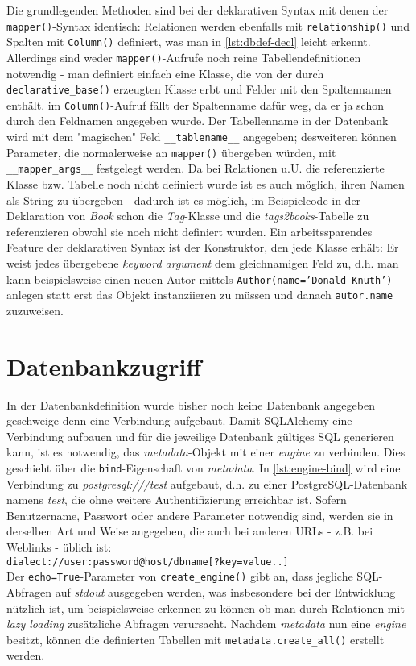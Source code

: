 Die grundlegenden Methoden sind bei der deklarativen Syntax mit denen der
\texttt{mapper()}-Syntax identisch: Relationen werden ebenfalls mit
\texttt{relationship()} und Spalten mit \texttt{Column()} definiert, was man in
\autoref{lst:dbdef-decl} leicht erkennt.
Allerdings sind weder \texttt{mapper()}-Aufrufe noch reine Tabellendefinitionen
notwendig - man definiert einfach eine Klasse, die von der durch
\texttt{declarative\_base()} erzeugten Klasse erbt und Felder mit den
Spaltennamen enthält. im \texttt{Column()}-Aufruf fällt der Spaltenname dafür
weg, da er ja schon durch den Feldnamen angegeben wurde. Der Tabellenname in der
Datenbank wird mit dem "magischen" Feld \texttt{\_\_tablename\_\_} angegeben;
desweiteren können Parameter, die normalerweise an \texttt{mapper()} übergeben
würden, mit \texttt{\_\_mapper\_args\_\_} festgelegt werden.
Da bei Relationen u.U. die referenzierte Klasse bzw. Tabelle noch nicht definiert
wurde ist es auch möglich, ihren Namen als String zu übergeben - dadurch ist es
möglich, im Beispielcode in der Deklaration von \emph{Book} schon die
\emph{Tag}-Klasse und die \emph{tags2books}-Tabelle zu referenzieren obwohl sie
noch nicht definiert wurden.
Ein arbeitssparendes Feature der deklarativen Syntax ist der Konstruktor, den
jede Klasse erhält: Er weist jedes übergebene \textit{keyword argument} dem
gleichnamigen Feld zu, d.h. man kann beispielsweise einen neuen Autor mittels
\texttt{Author(name='Donald Knuth')} anlegen statt erst das Objekt instanziieren
zu müssen und danach \texttt{autor.name} zuzuweisen.




\section{Datenbankzugriff}

In der Datenbankdefinition wurde bisher noch keine Datenbank angegeben
geschweige denn eine Verbindung aufgebaut. Damit SQLAlchemy eine Verbindung
aufbauen und für die jeweilige Datenbank gültiges SQL generieren kann, ist es
notwendig, das \emph{metadata}-Objekt mit einer \emph{engine} zu verbinden. Dies
geschieht über die \texttt{bind}-Eigenschaft von \emph{metadata}. In
\autoref{lst:engine-bind} wird eine Verbindung zu \emph{postgresql:///test}
aufgebaut, d.h. zu einer PostgreSQL-Datenbank namens \emph{test}, die ohne
weitere Authentifizierung erreichbar ist. Sofern Benutzername, Passwort oder
andere Parameter notwendig sind, werden sie in derselben Art und Weise
angegeben, die auch bei anderen URLs - z.B. bei Weblinks - üblich ist: \\
\texttt{dialect://user:password@host/dbname[?key=value..]} \\
Der \texttt{echo=True}-Parameter von \texttt{create\_engine()} gibt an, dass
jegliche SQL-Abfragen auf \emph{stdout} ausgegeben werden, was insbesondere bei
der Entwicklung nützlich ist, um beispielsweise erkennen zu können ob man
durch Relationen mit \emph{lazy loading} zusätzliche Abfragen verursacht.
Nachdem \emph{metadata} nun eine \emph{engine} besitzt, können die definierten
Tabellen mit \texttt{metadata.create\_all()} erstellt werden.


